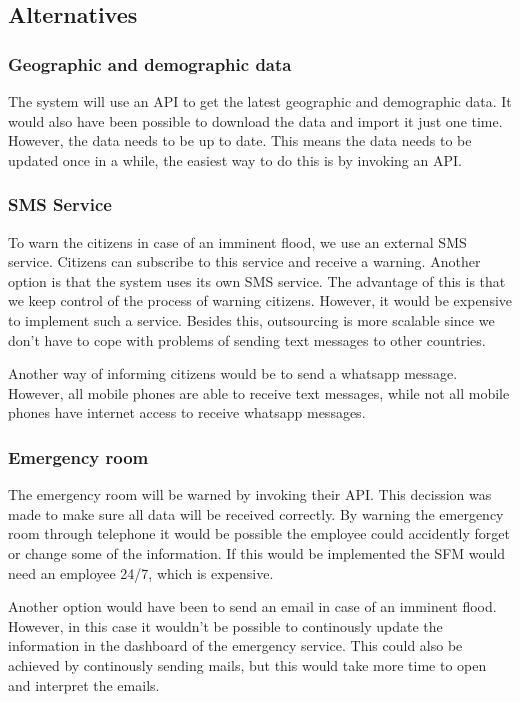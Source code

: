 \subsection{Alternatives}
\subsubsection*{Geographic and demographic data}
The system will use an API to get the latest geographic and demographic data. It would also have been possible to download the data and import it just one time. However, the data needs to be up to date. This means the data needs to be updated once in a while, the easiest way to do this is by invoking an API.

\subsubsection*{SMS Service}
To warn the citizens in case of an imminent flood, we use an external SMS service. Citizens can subscribe to this service and receive a warning. Another option is that the system uses its own SMS service. The advantage of this is that we keep control of the process of warning citizens. However, it would be expensive to implement such a service. Besides this, outsourcing is more scalable since we don't have to cope with problems of sending text messages to other countries.

Another way of informing citizens would be to send a whatsapp message. However, all mobile phones are able to receive text messages, while not all mobile phones have internet access to receive whatsapp messages.  

\subsubsection*{Emergency room}
The emergency room will be warned by invoking their API. This decission was made to make sure all data will be received correctly. By warning the emergency room through telephone it would be possible the employee could accidently forget or change some of the information. If this would be implemented the SFM would need an employee 24/7, which is expensive. 

Another option would have been to send an email in case of an imminent flood. However, in this case it wouldn't be possible to continously update the information in the dashboard of the emergency service. This could also be achieved by continously sending mails, but this would take more time to open and interpret the emails.

